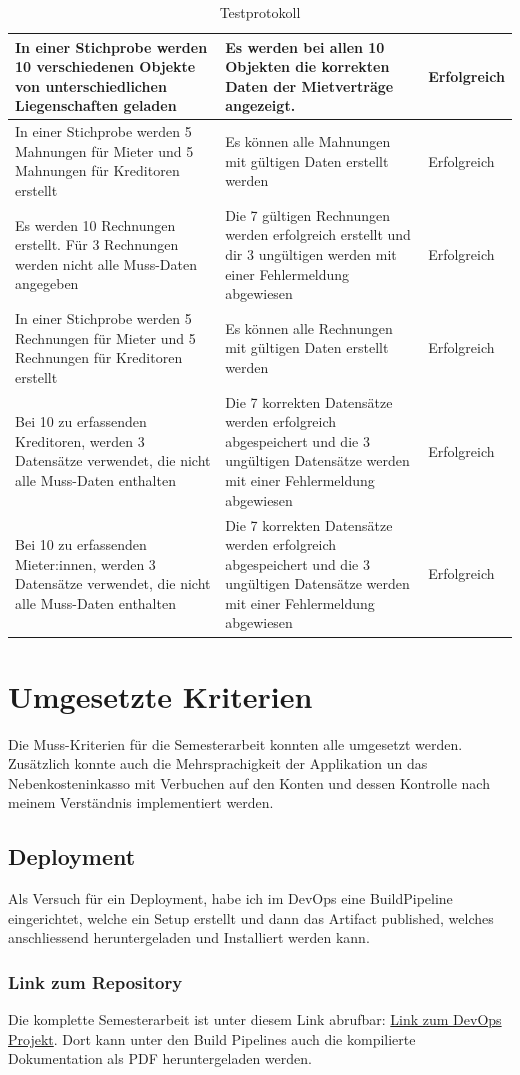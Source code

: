 \begin{table}[H]
\begin{tabulary}{1.0\textwidth}{|L|L|m{2cm}|}
    \hline
    In einer Stichprobe werden 10 verschiedenen Objekte von unterschiedlichen Liegenschaften geladen & Es werden bei allen 10 Objekten die korrekten Daten der Mietverträge angezeigt. &  Erfolgreich\\
    \hline
    In einer Stichprobe werden 5 Mahnungen für Mieter und 5 Mahnungen für Kreditoren erstellt & Es können alle Mahnungen mit gültigen Daten erstellt werden & Erfolgreich\\
    \hline
    Es werden 10 Rechnungen erstellt. Für 3 Rechnungen werden nicht alle Muss-Daten angegeben & Die 7 gültigen Rechnungen werden erfolgreich erstellt und dir 3 ungültigen werden mit einer Fehlermeldung abgewiesen &  Erfolgreich\\
    \hline   
    In einer Stichprobe werden 5 Rechnungen für Mieter und 5 Rechnungen für Kreditoren erstellt & Es können alle Rechnungen mit gültigen Daten erstellt werden &  Erfolgreich\\
    \hline
    Bei 10 zu erfassenden Kreditoren, werden 3 Datensätze verwendet, die nicht alle Muss-Daten enthalten & Die 7 korrekten Datensätze werden erfolgreich abgespeichert und die 3 ungültigen Datensätze werden mit einer Fehlermeldung abgewiesen &  Erfolgreich\\
    \hline
    Bei 10 zu erfassenden Mieter:innen, werden 3 Datensätze verwendet, die nicht alle Muss-Daten enthalten & Die 7 korrekten Datensätze werden erfolgreich abgespeichert und die 3 ungültigen Datensätze werden mit einer Fehlermeldung abgewiesen &  Erfolgreich\\
    \hline
  \end{tabulary}
  \caption{Testprotokoll}
\end{table}

\section{Umgesetzte Kriterien}
Die Muss-Kriterien für die Semesterarbeit konnten alle umgesetzt werden. Zusätzlich konnte auch die Mehrsprachigkeit der Applikation un das Nebenkosteninkasso mit Verbuchen auf den Konten und dessen Kontrolle nach meinem Verständnis implementiert werden.

\subsection{Deployment}
Als Versuch für ein Deployment, habe ich im DevOps eine BuildPipeline eingerichtet, welche ein Setup erstellt und dann das Artifact published, welches anschliessend heruntergeladen und Installiert werden kann. 

\subsubsection{Link zum Repository}
Die komplette Semesterarbeit ist unter diesem Link abrufbar: \href{https://dev.azure.com/michaelneuhaus/Semesterarbeit/}{Link zum DevOps Projekt}. Dort kann unter den Build Pipelines auch die kompilierte Dokumentation als PDF heruntergeladen werden.